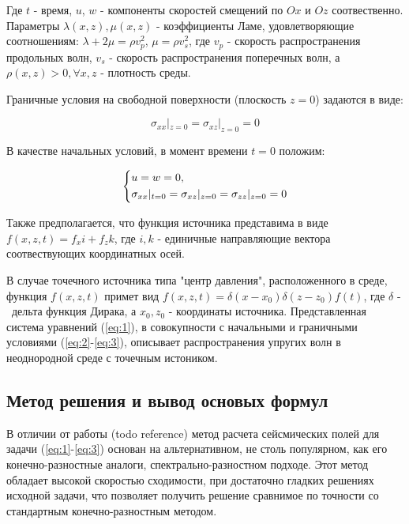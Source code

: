 Где $t$ - время, $u$, $w$ - компоненты скоростей смещений по $Ox$ и $Oz$ соотвественно.
Параметры $\lambda(x,z), \mu(x,z)$ - коэффициенты Ламе, удовлетворяющие соотношениям: $\lambda + 2\mu=\rho{v}_p^2$, $\mu=\rho{v}_s^2$, 
где $v_p$ - скорость распространения продольных волн, $v_s$ - скорость распространения поперечных волн,
а $\rho(x,z)>0, \forall x,z$ - плотность среды.

Граничные условия на свободной поверхности (плоскость $z = 0$) задаются в виде:

\begin{equation}
	\label{eq:2}
	\sigma_{xx}|_{z=0}=\sigma_{xz}|_{z=0}=0
\end{equation}

В качестве начальных условий, в момент времени $t=0$ положим:

\begin{equation}
\begin{dcases}
	\label{eq:3}
	u = w = 0, \\
	\sigma_{xx}|_{t=0}=\sigma_{xz}|_{z=0}=\sigma_{zz}|_{z=0}=0
\end{dcases}
\end{equation}

Также предполагается, что функция источника представима в виде $f(x,z,t)=f_xi+f_zk$,
где $i, k$ - единичные направляющие вектора соотвествующих координатных осей.

В случае точечного источника типа "центр давления", расположенного в среде, функция $f(x,z,t)$ примет вид $f(x,z,t)=\delta(x-x_0)\delta(z-z_0)f(t)$,
где $\delta$ -  дельта функция Дирака, а $x_0, z_0$ - координаты источника.
Представленная система уравнений (\ref{eq:1}), в совокупности с начальными и граничными условиями (\ref{eq:2}-\ref{eq:3}),
описывает распространения упругих волн в неоднородной среде с точечным истоником.
\subsection{Метод решения и вывод основых формул}
В отличии от работы (todo reference) метод расчета сейсмических полей для задачи (\ref{eq:1}-\ref{eq:3}) основан на альтернативном,
не столь популярном, как его конечно-разностные аналоги, спектрально-разностном подходе. Этот метод обладает высокой скоростью сходимости,
при достаточно гладких решениях исходной задачи, что позволяет получить решение сравнимое по точности со стандартным
конечно-разностным методом.

